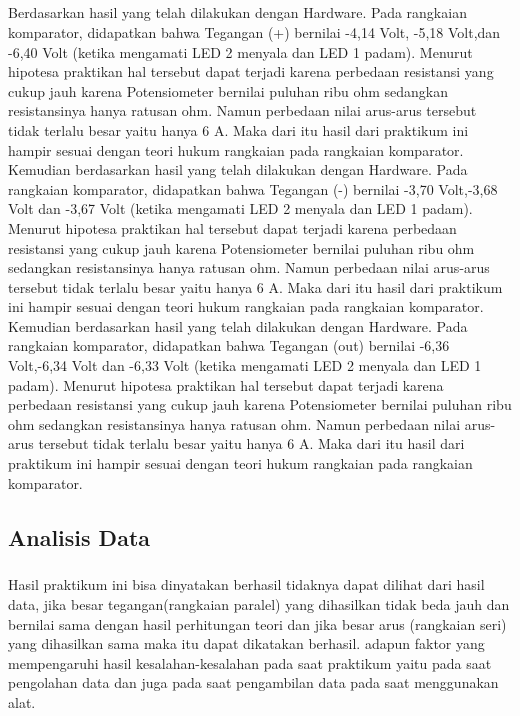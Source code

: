 \documentclass[12pt,a4paper]{article}
\begin{document}
\subparagraph{ }
	Berdasarkan hasil yang telah dilakukan dengan Hardware. Pada rangkaian komparator, didapatkan bahwa Tegangan (+) bernilai -4,14 Volt, -5,18 Volt,dan -6,40 Volt (ketika mengamati LED 2 menyala dan LED 1 padam). Menurut hipotesa praktikan hal tersebut dapat terjadi karena perbedaan resistansi yang cukup jauh karena Potensiometer bernilai puluhan ribu ohm sedangkan resistansinya hanya ratusan ohm. Namun perbedaan nilai arus-arus tersebut tidak terlalu besar yaitu hanya 6 A. Maka dari itu hasil dari praktikum ini hampir sesuai dengan teori hukum rangkaian pada rangkaian komparator.
	Kemudian berdasarkan hasil yang telah dilakukan dengan Hardware. Pada rangkaian komparator, didapatkan bahwa Tegangan (-) bernilai -3,70 Volt,-3,68 Volt dan -3,67 Volt (ketika mengamati LED 2 menyala dan LED 1 padam). Menurut hipotesa praktikan hal tersebut dapat terjadi karena perbedaan resistansi yang cukup jauh karena Potensiometer bernilai puluhan ribu ohm sedangkan resistansinya hanya ratusan ohm. Namun perbedaan nilai arus-arus tersebut tidak terlalu besar yaitu hanya 6 A. Maka dari itu hasil dari praktikum ini hampir sesuai dengan teori hukum rangkaian pada rangkaian komparator.
	Kemudian berdasarkan hasil yang telah dilakukan dengan Hardware. Pada rangkaian komparator, didapatkan bahwa Tegangan (out) bernilai -6,36 Volt,-6,34 Volt dan -6,33 Volt (ketika mengamati LED 2 menyala dan LED 1 padam). Menurut hipotesa praktikan hal tersebut dapat terjadi karena perbedaan resistansi yang cukup jauh karena Potensiometer bernilai puluhan ribu ohm sedangkan resistansinya hanya ratusan ohm. Namun perbedaan nilai arus-arus tersebut tidak terlalu besar yaitu hanya 6 A. Maka dari itu hasil dari praktikum ini hampir sesuai dengan teori hukum rangkaian pada rangkaian komparator.	
\newpage
 
\subsection{Analisis Data}
\subparagraph{}
	Hasil praktikum ini bisa dinyatakan berhasil tidaknya dapat dilihat dari hasil data, jika besar tegangan(rangkaian paralel) yang dihasilkan tidak beda jauh dan bernilai sama dengan hasil perhitungan teori dan jika besar arus (rangkaian seri) yang dihasilkan sama maka itu dapat dikatakan berhasil. adapun faktor yang mempengaruhi hasil kesalahan-kesalahan pada saat praktikum yaitu pada saat pengolahan data dan juga pada saat pengambilan data pada saat menggunakan alat.
 

\newpage
\end{document}
